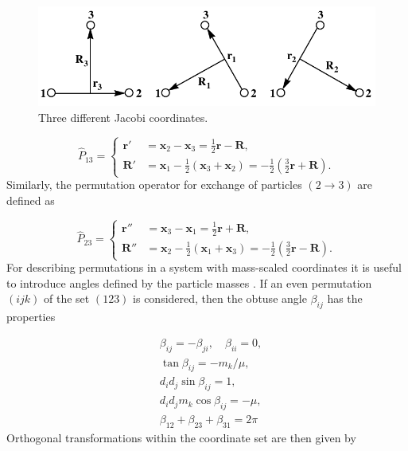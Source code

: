 \documentclass{article}
\numberwithin{equation}{section}
\numberwithin{figure}{section}
\begin{document}
\begin{figure}
	\includegraphics[width=\linewidth]{jacobii.pdf}
	\caption{Three different Jacobi coordinates.}
	\label{fig:2}
\end{figure}

\begin{equation}
\hat{P}_{13} = \left \{ \begin{aligned}
\mathbf{r}' &= \mathbf{x}_2 - \mathbf{x}_3 = \frac{1}{2}\mathbf{r} - \mathbf{R}, \\
\mathbf{R}' &= \mathbf{x}_1 - \frac{1}{2}(\mathbf{x}_3 + \mathbf{x}_2) = -\frac{1}{2}(\frac{3}{2} \mathbf{r} + \mathbf{R}). 
\end{aligned}
\right.
\end{equation}
Similarly, the permutation operator for exchange of particles $(2 \rightarrow 3)$ are defined as

\begin{equation}
\hat{P}_{23} = \left \{ \begin{aligned}
\mathbf{r}'' &= \mathbf{x}_3 - \mathbf{x}_1 = \frac{1}{2}\mathbf{r} + \mathbf{R}, \\
\mathbf{R}'' &= \mathbf{x}_2 - \frac{1}{2}(\mathbf{x}_1 + \mathbf{x}_3) = -\frac{1}{2} (\frac{3}{2} \mathbf{r} - \mathbf{R}).
\end{aligned}
\right.
\end{equation}
For describing permutations in a system with mass-scaled coordinates it is useful to introduce angles defined by the particle masses \cite{Smith1962}\cite{Johnson1980}. If an even permutation $(ijk)$ of the set $(123)$ is considered, then the obtuse angle $\beta_{ij}$ has the properties

\begin{subequations}
	\begin{align}
	&\beta_{ij} = -\beta_{ji}, \quad \beta_{ii} = 0,\\
	&\tan\beta_{ij} = -m_k/\mu,\\
	&d_{i}d_{j} \sin\beta_{ij} = 1,\\
	&d_{i}d_{j} m_{k} \cos\beta_{ij} = -\mu,\\
	&\beta_{12}+\beta_{23}+\beta_{31} = 2\pi
	\end{align}
\end{subequations}
Orthogonal transformations within the coordinate set are then given by 
\end{document}

